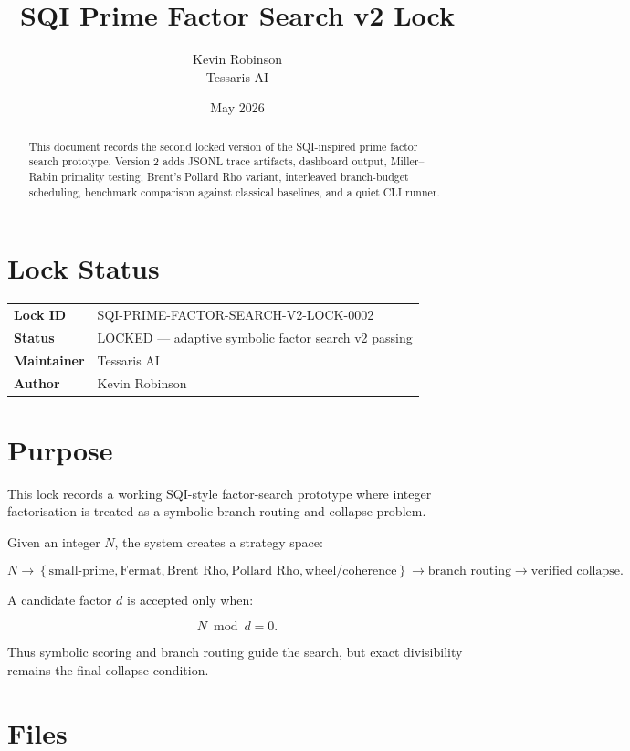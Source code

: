 \documentclass[11pt,a4paper]{article}
\title{\textbf{SQI Prime Factor Search v2 Lock}}
\author{Kevin Robinson \\ Tessaris AI}
\date{May 2026}
\begin{document}
\maketitle

\begin{abstract}
This document records the second locked version of the SQI-inspired prime factor search
prototype. Version 2 adds JSONL trace artifacts, dashboard output, Miller--Rabin primality
testing, Brent's Pollard Rho variant, interleaved branch-budget scheduling, benchmark
comparison against classical baselines, and a quiet CLI runner.
\end{abstract}

\section{Lock Status}

\begin{tabularx}{\textwidth}{@{}lX@{}}
\textbf{Lock ID} & SQI-PRIME-FACTOR-SEARCH-V2-LOCK-0002 \\
\textbf{Status} & LOCKED --- adaptive symbolic factor search v2 passing \\
\textbf{Maintainer} & Tessaris AI \\
\textbf{Author} & Kevin Robinson \\
\end{tabularx}

\section{Purpose}

This lock records a working SQI-style factor-search prototype where integer factorisation
is treated as a symbolic branch-routing and collapse problem.

Given an integer \(N\), the system creates a strategy space:

\[
N
\rightarrow
\left\{
\text{small-prime},
\text{Fermat},
\text{Brent Rho},
\text{Pollard Rho},
\text{wheel/coherence}
\right\}
\rightarrow
\text{branch routing}
\rightarrow
\text{verified collapse}.
\]

A candidate factor \(d\) is accepted only when:

\[
N \bmod d = 0.
\]

Thus symbolic scoring and branch routing guide the search, but exact divisibility remains
the final collapse condition.

\section{Files}
\end{document}
